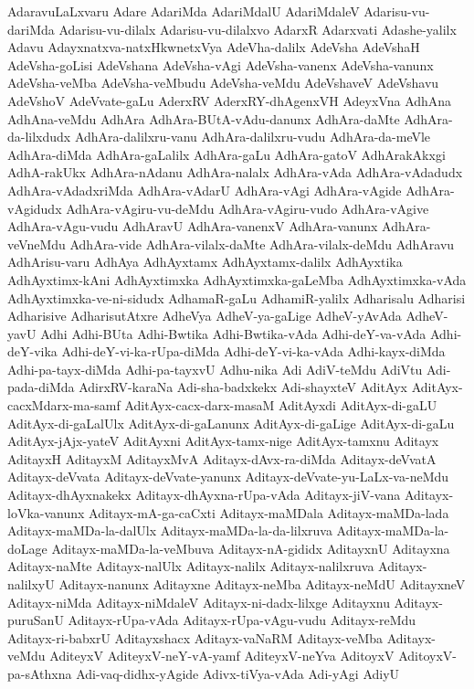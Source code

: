 {AdaravuLaLxvaru
Adare
AdariMda
AdariMdalU
AdariMdaleV
Adarisu-vu-dariMda
Adarisu-vu-dilalx
Adarisu-vu-dilalxvo
AdarxR
Adarxvati
Adashe-yalilx
Adavu
Adayxnatxva-natxHkwnetxVya
AdeVha-dalilx
AdeVsha
AdeVshaH
AdeVsha-goLisi
AdeVshana
AdeVsha-vAgi
AdeVsha-vanenx
AdeVsha-vanunx
AdeVsha-veMba
AdeVsha-veMbudu
AdeVsha-veMdu
AdeVshaveV
AdeVshavu
AdeVshoV
AdeVvate-gaLu
AderxRV
AderxRY-dhAgenxVH
AdeyxVna
AdhAna
AdhAna-veMdu
AdhAra
AdhAra-BUtA-vAdu-danunx
AdhAra-daMte
AdhAra-da-lilxdudx
AdhAra-dalilxru-vanu
AdhAra-dalilxru-vudu
AdhAra-da-meVle
AdhAra-diMda
AdhAra-gaLalilx
AdhAra-gaLu
AdhAra-gatoV
AdhArakAkxgi
AdhA-rakUkx
AdhAra-nAdanu
AdhAra-nalalx
AdhAra-vAda
AdhAra-vAdadudx
AdhAra-vAdadxriMda
AdhAra-vAdarU
AdhAra-vAgi
AdhAra-vAgide
AdhAra-vAgidudx
AdhAra-vAgiru-vu-deMdu
AdhAra-vAgiru-vudo
AdhAra-vAgive
AdhAra-vAgu-vudu
AdhAravU
AdhAra-vanenxV
AdhAra-vanunx
AdhAra-veVneMdu
AdhAra-vide
AdhAra-vilalx-daMte
AdhAra-vilalx-deMdu
AdhAravu
AdhArisu-varu
AdhAya
AdhAyxtamx
AdhAyxtamx-dalilx
AdhAyxtika
AdhAyxtimx-kAni
AdhAyxtimxka
AdhAyxtimxka-gaLeMba
AdhAyxtimxka-vAda
AdhAyxtimxka-ve-ni-sidudx
AdhamaR-gaLu
AdhamiR-yalilx
Adharisalu
Adharisi
Adharisive
AdharisutAtxre
AdheVya
AdheV-ya-gaLige
AdheV-yAvAda
AdheV-yavU
Adhi
Adhi-BUta
Adhi-Bwtika
Adhi-Bwtika-vAda
Adhi-deY-va-vAda
Adhi-deY-vika
Adhi-deY-vi-ka-rUpa-diMda
Adhi-deY-vi-ka-vAda
Adhi-kayx-diMda
Adhi-pa-tayx-diMda
Adhi-pa-tayxvU
Adhu-nika
Adi
AdiV-teMdu
AdiVtu
Adi-pada-diMda
AdirxRV-karaNa
Adi-sha-badxkekx
Adi-shayxteV
AditAyx
AditAyx-cacxMdarx-ma-samf
AditAyx-cacx-darx-masaM
AditAyxdi
AditAyx-di-gaLU
AditAyx-di-gaLalUlx
AditAyx-di-gaLanunx
AditAyx-di-gaLige
AditAyx-di-gaLu
AditAyx-jAjx-yateV
AditAyxni
AditAyx-tamx-nige
AditAyx-tamxnu
Aditayx
AditayxH
AditayxM
AditayxMvA
Aditayx-dAvx-ra-diMda
Aditayx-deVvatA
Aditayx-deVvata
Aditayx-deVvate-yanunx
Aditayx-deVvate-yu-LaLx-va-neMdu
Aditayx-dhAyxnakekx
Aditayx-dhAyxna-rUpa-vAda
Aditayx-jiV-vana
Aditayx-loVka-vanunx
Aditayx-mA-ga-caCxti
Aditayx-maMDala
Aditayx-maMDa-lada
Aditayx-maMDa-la-dalUlx
Aditayx-maMDa-la-da-lilxruva
Aditayx-maMDa-la-doLage
Aditayx-maMDa-la-veMbuva
Aditayx-nA-gididx
AditayxnU
Aditayxna
Aditayx-naMte
Aditayx-nalUlx
Aditayx-nalilx
Aditayx-nalilxruva
Aditayx-nalilxyU
Aditayx-nanunx
Aditayxne
Aditayx-neMba
Aditayx-neMdU
AditayxneV
Aditayx-niMda
Aditayx-niMdaleV
Aditayx-ni-dadx-lilxge
Aditayxnu
Aditayx-puruSanU
Aditayx-rUpa-vAda
Aditayx-rUpa-vAgu-vudu
Aditayx-reMdu
Aditayx-ri-babxrU
Aditayxshacx
Aditayx-vaNaRM
Aditayx-veMba
Aditayx-veMdu
AditeyxV
AditeyxV-neY-vA-yamf
AditeyxV-neYva
AditoyxV
AditoyxV-pa-sAthxna
Adi-vaq-didhx-yAgide
Adivx-tiVya-vAda
Adi-yAgi
AdiyU
}
